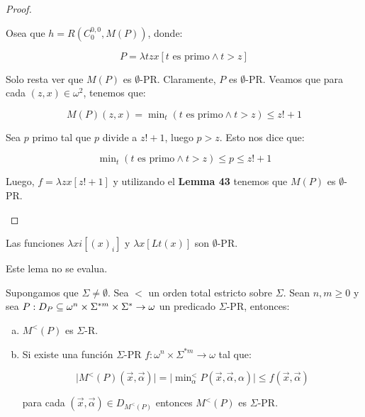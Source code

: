 \begin{proof}
\begin{enumerate}[a)]
        \PN Osea que $h = R \left(C_{0}^{0,0},M(P)\right)$, donde:

        \[
          P = \lambda tzx\left[t \text{ es primo} \wedge t > z\right]
        \]

        \PN Solo resta ver que $M(P)$ es $\emptyset$-PR. Claramente, $P$ es $\emptyset$-PR.
        \PN Veamos que para cada $(z,x) \in \omega^{2}$, tenemos que:

        \[
          M(P)(z,x) = \min\nolimits_{t}\left(t \text{ es primo} \wedge t > z\right) \leq z! + 1
        \]

        \PN Sea $p$ primo tal que $p$ divide a $z!+1$, luego $p > z$. Esto nos dice que:

        \[
          \min\nolimits_{t}\left(t \text{ es primo} \wedge t > z\right) \leq p \leq z! + 1
        \]

        \PN Luego, $f = \lambda zx\left[z! + 1\right]$ y utilizando el \textbf{Lemma 43} tenemos que $M(P)$ es
        $\emptyset$-PR.
    \end{enumerate}
  \end{proof}

  \begin{lemma}
    \PN Las funciones $\lambda xi\left[(x)_{i}\right]$ y $\lambda x\left[Lt(x)\right]$ son $\emptyset$-PR.
  \end{lemma}

  \begin{lemma}
    \PN Este lema no se evalua.
  \end{lemma}

  \begin{lemma}
    \PN Supongamos que $\Sigma \neq \emptyset$. Sea $<$ un orden total estricto sobre $\Sigma$. Sean $n, m \geq 0$ y
    sea $P: D_{P} \subseteq \omega^{n} \times \Sigma^{\ast m} \times \Sigma^{\ast} \rightarrow \omega$ un predicado
    $\Sigma$-PR, entonces:

    \begin{enumerate}[a)]
      \item $M^{<}(P)$ es $\Sigma$-R.
      \item Si existe una función $\Sigma$-PR $f: \omega^{n} \times \Sigma^{\ast m} \rightarrow \omega$ tal que:

        \[
          \lvert M^{<}(P)(\vec{x},\vec{\alpha})\rvert = \lvert \min\nolimits_{\alpha}^{<} P(\vec{x},
          \vec{\alpha},\alpha)\rvert \leq f(\vec{x},\vec{\alpha})
        \]

        \PN para cada $(\vec{x},\vec{\alpha}) \in D_{M^{< }(P)}$ entonces $M^{<}(P)$ es $\Sigma$-PR.
    \end{enumerate}
  \end{lemma}


